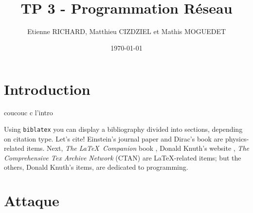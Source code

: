 \documentclass[12pt]{article}
\title{TP 3 - Programmation Réseau}	\let\Title\@title
\author{Etienne RICHARD, Matthieu CIZDZIEL et Mathis MOGUEDET} \let\Author\@author
\date{\today}           	\let\Date\@date
\begin{document}
\maketitle
\pagebreak

\tableofcontents
\pagebreak

\section*{Introduction}
coucouc c l'intro
% 

% 
Using \texttt{biblatex} you can display a bibliography divided into sections, depending on citation type. 
Let's cite! Einstein's journal paper \cite{einstein} and Dirac's book \cite{dirac} are physics-related items. 
Next, \textit{The \LaTeX\ Companion} book \cite{latexcompanion}, Donald Knuth's website \cite{knuthwebsite}, \textit{The Comprehensive Tex Archive Network} (CTAN) \cite{ctan} are \LaTeX-related items; but the others, Donald Knuth's items, \cite{knuth-fa,knuth-acp} are dedicated to programming. 
\section{Attaque}
% 
\cite{ctan}

\medskip
\printbibliography[title={Whole bibliography}]
\end{document}
